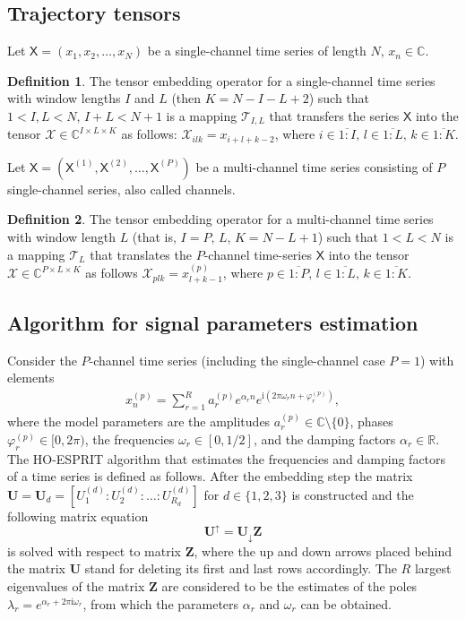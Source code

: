 \documentclass[12pt]{article}
\newcommand{\tX}{\mathsf{X}}
\newcommand{\calX}{\mathcal{X}}
\newcommand{\calT}{\mathcal{T}}
\newcommand{\iu}{\mathrm{i}}
\theoremstyle{definition}
\newtheorem{definition}{Definition}
\begin{document}
\subsection{Trajectory tensors}
Let $\tX = (x_1, x_2, \ldots, x_N)$ be a single-channel time series
of length $N$, $x_n \in \mathbb{C}$.
\begin{definition}
  The tensor embedding operator for a single-channel time series with
  window lengths $I$ and $L$ (then $K=N-I-L+2$) such that ${1< I,L <
  N},\, {I + L < N + 1}$
  is a mapping $\calT_{I,L}$ that transfers the series
  $\tX$ into the tensor $\calX \in \mathbb{C}^{I\times L \times K}$
  as follows: ${\mathcal{X}_{ilk}=x_{i+l+k-2}}$, where
  $i\in \overline{1:I},\, l \in\overline{1:L},\, k \in\overline{1:K}$.
\end{definition}

Let $\tX = \left(\tX^{(1)}, \tX^{(2)}, \ldots, \tX^{(P)}\right)$ be a
multi-channel
time series consisting of $P$ single-channel series, also called channels.
\begin{definition}
  The tensor embedding operator for a multi-channel time series with
  window length $L$ (that is, $I=P$, $L$, $K=N-L+1$) such that ${1< L
  < N}$ is a mapping $\calT_{L}$
  that translates the
  $P$-channel time-series $\tX$ into the tensor $\calX \in
  \mathbb{C}^{P \times L \times K}$ as follows
  $\mathcal{X}_{plk} =  x_{l+k-1}^{(p)}$, where ${{p \in
    \overline{1:P}},\, l \in
  \overline{1:L}},\, {k \in \overline{1:K}}$.
\end{definition}

\subsection{Algorithm for signal parameters estimation}
Consider the $P$-channel time series (including the single-channel case
$P=1$) with elements
\begin{gather*}
  x_n^{(p)}= \sum_{r=1}^{R} a_r^{(p)} e^{\alpha_r n} e^{\iu\left(2\pi
  \omega_r n + \varphi_r^{(p)}\right)},
\end{gather*}
where the model parameters are the amplitudes $a_r^{(p)} \in
\mathbb{C}\setminus\{0\}$, phases ${\varphi_r^{(p)} \in [0, 2\pi)}$,
the frequencies $\omega_r\in [0, 1/2]$, and the damping factors $\alpha_r \in
\mathbb{R}$. The HO-ESPRIT algorithm that estimates the frequencies
and damping factors of a time series is defined as follows.
After the embedding step the matrix $\mathbf{U} = \mathbf{U}_d =
\left[U_1^{(d)} :
U_2^{(d)}:\ldots : U_{R_d}^{(d)}\right]$ for $d\in \{1, 2,
3\}$ is constructed and the following matrix equation
\begin{equation*}
  \mathbf{U}^{\uparrow}=\mathbf{U}_{\downarrow}\mathbf{Z}
\end{equation*}
is solved with respect to matrix $\mathbf{Z}$, where the up and down
arrows placed
behind the matrix $\mathbf{U}$ stand for deleting its first and last
rows accordingly.
The $R$ largest eigenvalues of the matrix $\mathbf{Z}$ are considered
to be the estimates of the poles $\lambda_r = e^{\alpha_r + 2\pi\iu
\omega_r}$, from which the parameters $\alpha_r$ and $\omega_r$ can be obtained.
\end{document}

